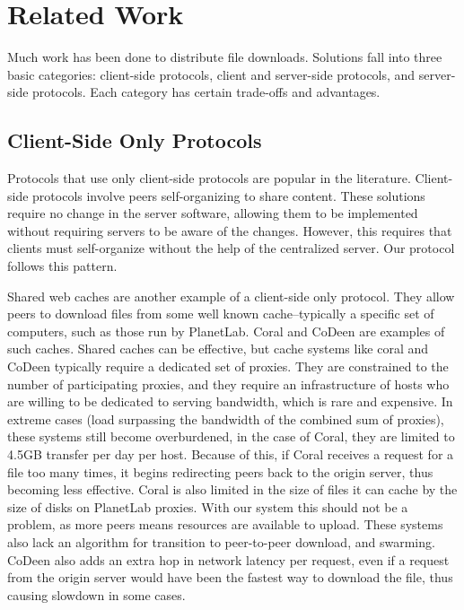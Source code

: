 \section{Related Work}\label{section:related_work}
Much work has been done to distribute file downloads.  Solutions fall into three basic categories: client-side protocols, client and server-side protocols, 
and server-side protocols.  Each category has certain trade-offs and advantages.

\subsection{Client-Side Only Protocols}
Protocols that use only client-side protocols are popular in the literature.  Client-side protocols involve peers self-organizing to share content.  
These solutions require no change in the server software, allowing them to be implemented without requiring servers to be aware of the changes.  However, 
this requires that clients must self-organize without the help of the centralized server.  Our protocol follows this pattern.

Shared web caches are another example of a client-side only protocol.  They allow peers to download files from some well known cache--typically a specific 
set of computers, such as those run by PlanetLab.  Coral \cite{coral} and CoDeen \cite{codeen} are examples of such caches.  Shared caches can be effective, but
cache systems like coral and CoDeen typically require a dedicated set of proxies.  They are constrained to the number of participating proxies, and they 
require an infrastructure of hosts who are willing to be dedicated to serving bandwidth, which is rare and expensive.  
In extreme cases (load surpassing the bandwidth of the combined sum of proxies), these systems still become overburdened, in the case of Coral, they are
limited to 4.5GB transfer per day per host.  Because of this, if Coral receives a request for a file too many times, it begins redirecting peers back to 
the origin server, thus becoming less effective.  Coral is also limited in the size of files it can cache by the size of disks on PlanetLab proxies.  
With our system this should not be a problem, as more peers means resources are available to upload.  These systems also lack an algorithm for transition 
to peer-to-peer download, and swarming.  CoDeen also adds an extra hop in network latency per request, even if a request from the origin server would have 
been the fastest way to download the file, thus causing slowdown in some cases.

